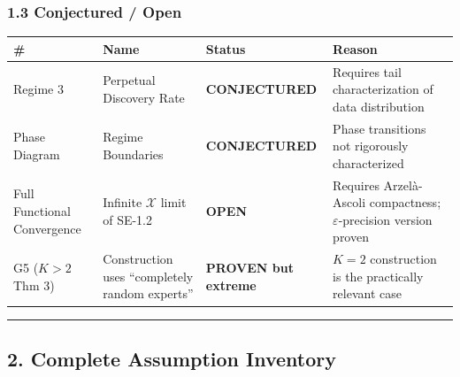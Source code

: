 \documentclass[
  12pt,
]{ctexart}
\begin{document}
\subsubsection{1.3 Conjectured / Open}\label{conjectured-open}

\begin{longtable}[]{@{}
  >{\raggedright\arraybackslash}p{}
  >{\raggedright\arraybackslash}p{}
  >{\raggedright\arraybackslash}p{}
  >{\raggedright\arraybackslash}p{}@{}}
\toprule\noalign{}
\begin{minipage}[b]{\linewidth}\raggedright
\#
\end{minipage} & \begin{minipage}[b]{\linewidth}\raggedright
Name
\end{minipage} & \begin{minipage}[b]{\linewidth}\raggedright
Status
\end{minipage} & \begin{minipage}[b]{\linewidth}\raggedright
Reason
\end{minipage} \\
\midrule\noalign{}
\endhead
\bottomrule\noalign{}
\endlastfoot
Regime 3 & Perpetual Discovery Rate & \textbf{CONJECTURED} & Requires
tail characterization of data distribution \\
Phase Diagram & Regime Boundaries & \textbf{CONJECTURED} & Phase
transitions not rigorously characterized \\
Full Functional Convergence & Infinite \(\mathcal{X}\) limit of SE-1.2 &
\textbf{OPEN} & Requires Arzelà-Ascoli compactness;
\(\varepsilon\)-precision version proven \\
G5 (\(K>2\) Thm 3) & Construction uses ``completely random experts'' &
\textbf{PROVEN but extreme} & \(K=2\) construction is the practically
relevant case \\
\end{longtable}

\begin{center}\rule{0.5\linewidth}{0.5pt}\end{center}

\subsection{2. Complete Assumption
Inventory}\label{complete-assumption-inventory}
\end{document}

